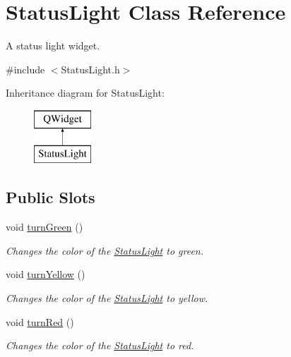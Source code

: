 \hypertarget{class_status_light}{\section{Status\-Light Class Reference}
\label{class_status_light}
}


A status light widget.  




{\ttfamily \#include $<$Status\-Light.\-h$>$}

Inheritance diagram for Status\-Light\-:\begin{figure}[H]
\begin{center}
\leavevmode
\includegraphics[height=2.000000cm]{class_status_light}
\end{center}
\end{figure}
\subsection*{Public Slots}
\begin{DoxyCompactItemize}
\item 
\hypertarget{class_status_light_ac386582cc63be97e9d89de40d1bc6695}{void \hyperlink{class_status_light_ac386582cc63be97e9d89de40d1bc6695}{turn\-Green} ()}\label{class_status_light_ac386582cc63be97e9d89de40d1bc6695}

\begin{DoxyCompactList}\small\item\em Changes the color of the \hyperlink{class_status_light}{Status\-Light} to green. \end{DoxyCompactList}\item 
\hypertarget{class_status_light_a506d58535796f3de633a9c94e0d9ff50}{void \hyperlink{class_status_light_a506d58535796f3de633a9c94e0d9ff50}{turn\-Yellow} ()}\label{class_status_light_a506d58535796f3de633a9c94e0d9ff50}

\begin{DoxyCompactList}\small\item\em Changes the color of the \hyperlink{class_status_light}{Status\-Light} to yellow. \end{DoxyCompactList}\item 
\hypertarget{class_status_light_a6d86f6ae871039417d737d160c63b012}{void \hyperlink{class_status_light_a6d86f6ae871039417d737d160c63b012}{turn\-Red} ()}\label{class_status_light_a6d86f6ae871039417d737d160c63b012}

\begin{DoxyCompactList}\small\item\em Changes the color of the \hyperlink{class_status_light}{Status\-Light} to red. \end{DoxyCompactList}\end{DoxyCompactItemize}
